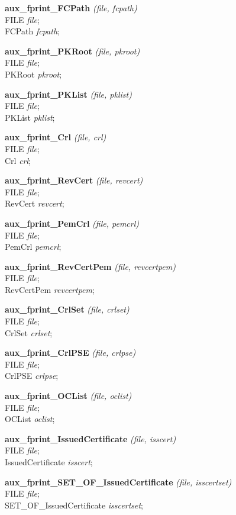 {\bf aux\_fprint\_FCPath} {\em (file, fcpath)} \\
FILE {\em *file}; \\
FCPath {\em *fcpath};

{\bf aux\_fprint\_PKRoot} {\em (file, pkroot)} \\
FILE {\em *file}; \\
PKRoot {\em *pkroot};

{\bf aux\_fprint\_PKList} {\em (file, pklist)} \\
FILE {\em *file}; \\
PKList {\em *pklist};

{\bf aux\_fprint\_Crl} {\em (file, crl)} \\
FILE {\em *file}; \\
Crl {\em *crl};

{\bf aux\_fprint\_RevCert} {\em (file, revcert)} \\
FILE {\em *file}; \\
RevCert {\em *revcert};

{\bf aux\_fprint\_PemCrl} {\em (file, pemcrl)} \\
FILE {\em *file}; \\
PemCrl {\em *pemcrl};

{\bf aux\_fprint\_RevCertPem} {\em (file, revcertpem)} \\
FILE {\em *file}; \\
RevCertPem {\em *revcertpem};

{\bf aux\_fprint\_CrlSet} {\em (file, crlset)} \\
FILE {\em *file}; \\
CrlSet {\em *crlset};

{\bf aux\_fprint\_CrlPSE} {\em (file, crlpse)} \\
FILE {\em *file}; \\
CrlPSE {\em *crlpse};

{\bf aux\_fprint\_OCList} {\em (file, oclist)} \\
FILE {\em *file}; \\
OCList {\em *oclist};

{\bf aux\_fprint\_IssuedCertificate} {\em (file, isscert)} \\
FILE {\em *file}; \\
IssuedCertificate {\em *isscert};

{\bf aux\_fprint\_SET\_OF\_IssuedCertificate} {\em (file, isscertset)} \\
FILE {\em *file}; \\
SET\_OF\_IssuedCertificate {\em *isscertset};

